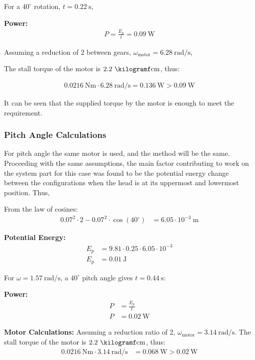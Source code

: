 \documentclass[12pt]{article}
\begin{document}
For a \(40^\circ\) rotation, \(t = 0.22\ \si{\second}\),

\textbf{Power:}
\begin{align}
P = \frac{E_k}{t} = 0.09\ \si{\watt}
\end{align}

Assuming a reduction of 2 between gears, \(\omega_\text{motor} = 6.28\ \si{\radian\per\second}\),

The stall torque of the motor is \(2.2\ \si{\kilogramf\centi\meter}\), thus:

\begin{align}
0.0216\ \si{\newton\meter} \cdot 6.28\ \si{\radian\per\second} = 0.136\ \si{\watt} > 0.09\ \si{\watt}
\end{align}

It can be seen that the supplied torque by the motor is enough to meet the requirement.

\subsubsection{Pitch Angle Calculations}

For pitch angle the same motor is used, and the method will be the same. Proceeding with the same assumptions, the main factor contributing to work on the system part for this case was found to be the potential energy change between the configurations when the head is at its uppermost and lowermost position. Thus,

From the law of cosines:
\begin{align}
0.07^2 \cdot 2 - 0.07^2 \cdot \cos(40^\circ) &= 6.05 \cdot 10^{-3}\ \si{\meter}
\end{align}

\textbf{Potential Energy:}
\begin{align}
E_p &= 9.81 \cdot 0.25 \cdot 6.05 \cdot 10^{-3} \\
E_p &= 0.01\ \si{\joule}
\end{align}

For \(\omega = 1.57\ \si{\radian\per\second}\), a \(40^\circ\) pitch angle gives \(t = 0.44\ \si{\second}\):

\textbf{Power:}
\begin{align}
P &= \frac{E_p}{t} \\
P &= 0.02\ \si{\watt}
\end{align}

\textbf{Motor Calculations:}  
Assuming a reduction ratio of 2, \(\omega_\text{motor} = 3.14\ \si{\radian\per\second}\).  
The stall torque of the motor is \(2.2\ \si{\kilogramf\centi\meter}\), thus:
\begin{align}
0.0216\ \si{\newton\meter} \cdot 3.14\ \si{\radian\per\second} &= 0.068\ \si{\watt} > 0.02\ \si{\watt}
\end{align}
\end{document}
